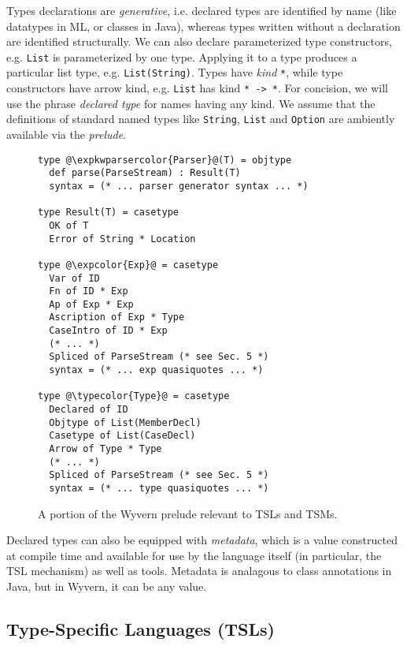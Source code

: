 \documentclass{sig-alternate}[10pt]
\newcommand{\lstinlinew}[1]{\lstinline[style=wyvern]{#1}}
\newcommand{\expkwparsercolor}[1]{\textcolor[HTML]{336699}{#1}}
\newcommand{\expcolor}[1]{\textcolor[HTML]{FF0033}{#1}}
\newcommand{\typecolor}[1]{\textcolor[HTML]{660066}{#1}}
\newcommand{\mycaption}[1]{\vspace{-10px}\caption{#1}\vspace{-10px}}
\begin{document}
Types declarations are \emph{generative}, i.e. declared types are identified by name (like datatypes in ML, or classes in Java), whereas types written without a declaration are identified structurally. We can also declare parameterized type constructors, e.g. \lstinlinew{List} is parameterized by one type. Applying it to a type produces a particular list type, e.g. \lstinlinew{List(String)}. Types have \emph{kind} \lstinlinew{*}, while {type constructors} have arrow kind, e.g. \lstinlinew{List} has kind \lstinlinew{* -> *}. For concision, we will use the phrase \emph{declared type} for names having any kind. 
We assume that the definitions of standard named types like \lstinlinew{String}, \lstinlinew{List} and \lstinlinew{Option} are ambiently available via the \emph{prelude}. 

\begin{figure}[t!]
\begin{lstlisting}[style=wyvern]
type @\expkwparsercolor{Parser}@(T) = objtype
  def parse(ParseStream) : Result(T)
  syntax = (* ... parser generator syntax ... *)

type Result(T) = casetype
  OK of T
  Error of String * Location

type @\expcolor{Exp}@ = casetype
  Var of ID
  Fn of ID * Exp
  Ap of Exp * Exp
  Ascription of Exp * Type
  CaseIntro of ID * Exp
  (* ... *)
  Spliced of ParseStream (* see Sec. 5 *)
  syntax = (* ... exp quasiquotes ... *)

type @\typecolor{Type}@ = casetype
  Declared of ID
  Objtype of List(MemberDecl)
  Casetype of List(CaseDecl)
  Arrow of Type * Type
  (* ... *)
  Spliced of ParseStream (* see Sec. 5 *)
  syntax = (* ... type quasiquotes ... *)
\end{lstlisting}
\mycaption{A portion of the Wyvern prelude relevant to TSLs and TSMs.}
\label{exp-prelude}
\end{figure}


Declared types can also be equipped with \emph{metadata}, which is a value constructed at compile time and available for use by the language itself (in particular, the TSL mechanism) as well as tools. Metadata is analagous to class annotations in Java, but in Wyvern, it can be any value. %

\subsection{Type-Specific Languages (TSLs)}
\end{document}
